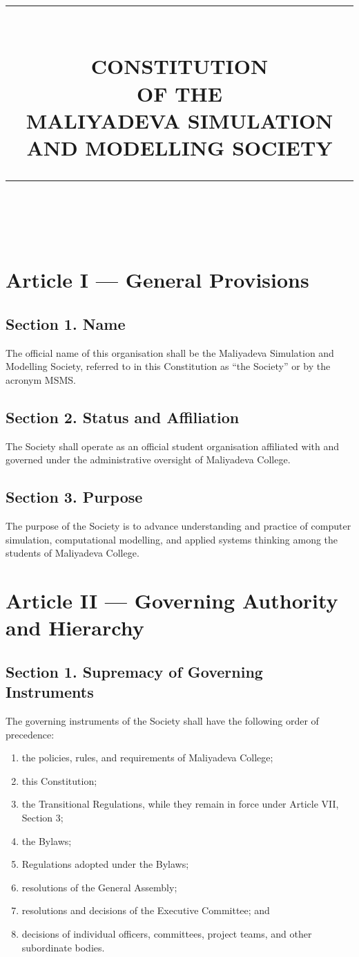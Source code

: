 \documentclass[11pt,a4paper]{article}
\title{%
    \rule{\textwidth}{0.8pt}\\[1.8em]
    {\Large\bfseries CONSTITUTION}\\[0.8em]
    {\large\bfseries OF THE}\\[0.8em]
    {\LARGE\bfseries MALIYADEVA SIMULATION\\[0.3em]AND MODELLING SOCIETY}\\[1.8em]
    \rule{\textwidth}{0.4pt}\\[1em]
}
\author{}
\date{}
\begin{document}
\maketitle
\thispagestyle{empty}

\clearpage


\section*{Article I --- General Provisions}

\subsection*{Section 1. Name}
The official name of this organisation shall be the Maliyadeva Simulation and Modelling Society, referred to in this Constitution as ``the Society'' or by the acronym MSMS.

\subsection*{Section 2. Status and Affiliation}
The Society shall operate as an official student organisation affiliated with and governed under the administrative oversight of Maliyadeva College.

\subsection*{Section 3. Purpose}
The purpose of the Society is to advance understanding and practice of computer simulation, computational modelling, and applied systems thinking among the students of Maliyadeva College.

\section*{Article II --- Governing Authority and Hierarchy}

\subsection*{Section 1. Supremacy of Governing Instruments}
The governing instruments of the Society shall have the following order of precedence:
\begin{enumerate}
    \item the policies, rules, and requirements of Maliyadeva College;
    \item this Constitution;
     \item the Transitional Regulations, while they remain in force under Article VII, Section 3;
    \item the Bylaws;
    \item Regulations adopted under the Bylaws;
    \item resolutions of the General Assembly;
    \item resolutions and decisions of the Executive Committee; and
    \item decisions of individual officers, committees, project teams, and other subordinate bodies.
\end{enumerate}
\end{document}
